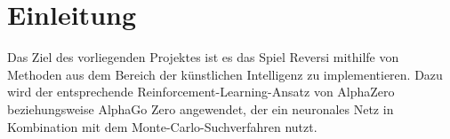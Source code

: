 \section{Einleitung}
Das Ziel des vorliegenden Projektes ist es das Spiel \glqq{}Reversi\grqq{} mithilfe von Methoden aus dem Bereich der künstlichen Intelligenz zu implementieren. Dazu wird der entsprechende Reinforcement-Learning-Ansatz von AlphaZero beziehungsweise AlphaGo Zero angewendet, der ein neuronales Netz in Kombination mit dem Monte-Carlo-Suchverfahren nutzt.



